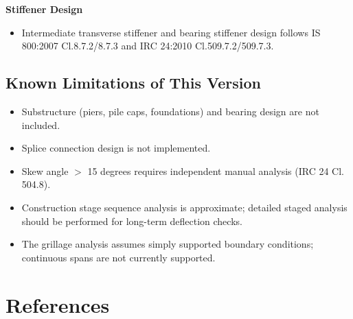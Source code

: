 \documentclass[12pt,a4paper]{report}
\numberwithin{table}{chapter}
\numberwithin{figure}{chapter}
\begin{document}
\textbf{Stiffener Design}

\begin{itemize}
\item Intermediate transverse stiffener and bearing stiffener design follows IS 800:2007 Cl.8.7.2/8.7.3 and IRC 24:2010 Cl.509.7.2/509.7.3.
\end{itemize}


\section{Known Limitations of This Version}
\label{sec:limitations}

\begin{itemize}
\item Substructure (piers, pile caps, foundations) and bearing design are not included.
\item Splice connection design is not implemented.
\item Skew angle $>$ 15 degrees requires independent manual analysis (IRC 24 Cl. 504.8).
\item Construction stage sequence analysis is approximate; detailed staged analysis
  should be performed for long-term deflection checks.
\item The grillage analysis assumes simply supported boundary conditions;
  continuous spans are not currently supported.
\end{itemize}


\chapter*{References}
\end{document}
